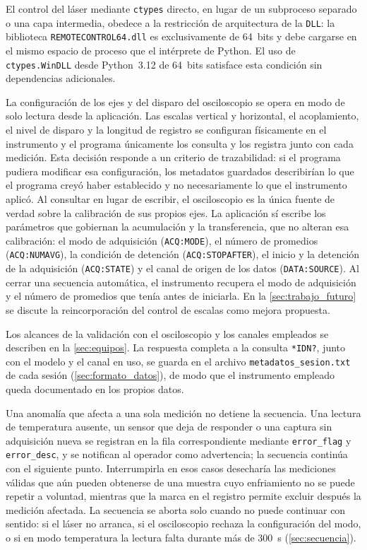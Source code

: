 El control del láser mediante \texttt{ctypes} directo, en lugar de un
subproceso separado o una capa intermedia, obedece a la restricción de
arquitectura de la \texttt{DLL}: la biblioteca
\texttt{REMOTECONTROL64.dll} es exclusivamente de 64~bits y debe
cargarse en el mismo espacio de proceso que el intérprete de Python. El
uso de \texttt{ctypes.WinDLL} desde Python~3.12 de 64~bits satisface
esta condición sin dependencias adicionales.

La configuración de los ejes y del disparo del osciloscopio se opera en
modo de solo lectura desde la aplicación. Las escalas vertical y
horizontal, el acoplamiento, el nivel de disparo y la longitud de
registro se configuran físicamente en el instrumento y el programa
únicamente los consulta y los registra junto con cada medición. Esta
decisión responde a un criterio de trazabilidad: si el programa pudiera
modificar esa configuración, los metadatos guardados describirían lo
que el programa creyó haber establecido y no necesariamente lo que el
instrumento aplicó. Al consultar en lugar de escribir, el osciloscopio
es la única fuente de verdad sobre la calibración de sus propios ejes.
La aplicación sí escribe los parámetros que gobiernan la acumulación y
la transferencia, que no alteran esa calibración: el modo de
adquisición (\texttt{ACQ:MODE}), el número de promedios
(\texttt{ACQ:NUMAVG}), la condición de detención
(\texttt{ACQ:STOPAFTER}), el inicio y la detención de la adquisición
(\texttt{ACQ:STATE}) y el canal de origen de los datos
(\texttt{DATA:SOURCE}). Al cerrar una secuencia automática, el
instrumento recupera el modo de adquisición y el número de promedios
que tenía antes de iniciarla. En la \cref{sec:trabajo_futuro} se
discute la reincorporación del control de escalas como mejora
propuesta.

Los alcances de la validación con el osciloscopio y los canales
empleados se describen en la \cref{sec:equipos}. La respuesta completa a la consulta
\texttt{*IDN?}, junto con el modelo y el canal en uso, se guarda en el
archivo \texttt{metadatos\_sesion.txt} de cada sesión
(\cref{sec:formato_datos}), de modo que el instrumento empleado queda
documentado en los propios datos.

Una anomalía que afecta a una sola medición no detiene la secuencia.
Una lectura de temperatura ausente, un sensor que deja de responder o
una captura sin adquisición nueva se registran en la fila
correspondiente mediante \texttt{error\_flag} y \texttt{error\_desc},
y se notifican al operador como advertencia; la secuencia continúa con
el siguiente punto. Interrumpirla en esos casos desecharía las
mediciones válidas que aún pueden obtenerse de una muestra cuyo
enfriamiento no se puede repetir a voluntad, mientras que la marca en
el registro permite excluir después la medición afectada. La secuencia
se aborta solo cuando no puede continuar con sentido: si el láser no
arranca, si el osciloscopio rechaza la configuración del modo, o si en
modo temperatura la lectura falta durante más de \SI{300}{\second}
(\cref{sec:secuencia}).

